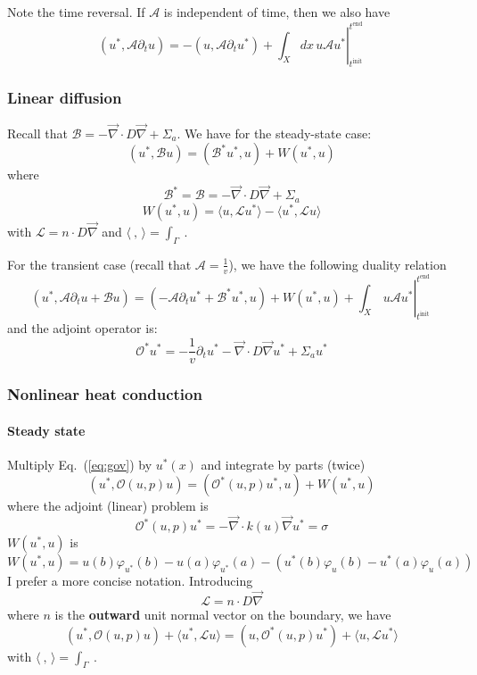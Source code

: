 \documentclass[11pt]{article}
\renewcommand{\div}{\vec{\nabla}\! \cdot \!}
\newcommand{\grad}{\vec{\nabla}}
\newcommand{\eqt}[1]{Eq.~(\ref{#1})}                     %
\newcommand{\be}{\begin{equation}}
\newcommand{\ee}{\end{equation}}
\renewcommand{\O}{\mathcal{O}}
\newcommand{\mc}[1]{\mathcal{#1}}
\newcommand{\us}{{u^\ast}}
\newcommand{\ti}{ {t^{\text{init}}} }
\newcommand{\te}{ {t^{\text{end }}} }
\begin{document}
Note the time reversal.
If $\mc{A}$ is independent of time, then we also have 
\be
(\us,\mc{A} \partial_t u )  
= -(u , \mc{A} \partial_t \us ) + 
\left. \int_X dx \, u \mc{A} \us \right|_\ti^\te 
\ee

\subsubsection{Linear diffusion}

Recall that $ \mc{B} =  -\div D \grad   + \Sigma_a $. We have for the steady-state case:
\be
(\us,\mc{B}u) = (\mc{B}^\ast\us,u) + W(\us,u)
\ee
where
\be
\mc{B}^\ast= \mc{B} =  -\div D \grad   + \Sigma_a 
\ee
\be
W(\us,u) = \langle u, \mc{L} \us \rangle  -  \langle \us, \mc{L} u \rangle
\ee
with $\mc{L} = n \cdot D\grad$ and $\langle \  , \, \rangle = \int_{\Gamma}\ $.


For the transient case (recall that $\mc{A} = \frac{1}{v}$), we have the following duality relation
\be
(\us,\mc{A}\partial_t u + \mc{B}u) = (-\mc{A}\partial_t \us +\mc{B}^\ast\us,u) + W(\us,u) + \left. \int_X \, u \mc{A} \us \right|_\ti^\te 
\ee
and the adjoint operator is:
\be
\O^\ast \us = -\frac{1}{v} \partial_t \us  -\div D \grad \us  + \Sigma_a \us 
\ee

\subsubsection{Nonlinear heat conduction}

\paragraph{Steady state} 

Multiply \eqt{eq:gov} by $\us(x)$ and integrate by parts (twice)
\be
(\us,\O(u,p)u) = (\O^\ast(u,p)\us,u) + W(\us,u)
\ee
where the adjoint (linear) problem is
\be
\O^\ast(u,p)\us = -\div k(u)  \grad \us = \sigma
\ee
%
$W(\us,u)$ is
\be
W(\us,u) = u(b)\varphi_\us(b)-u(a)\varphi_\us(a) -\left( \us(b)\varphi_u(b) -\us(a)\varphi_u(a)\right)
\ee
I prefer a more concise notation. Introducing
\be
\mc{L} = n \cdot D\grad
\ee where $n$ is the {\bf outward} unit normal vector on the boundary, 
we have
\be
(\us, \O(u,p)u) + \langle \us, \mc{L} u \rangle = (u, \O^\ast(u,p)\us) + \langle u, \mc{L} \us \rangle 
\ee
with $\langle \  , \, \rangle = \int_{\Gamma}\ $.
\end{document}
